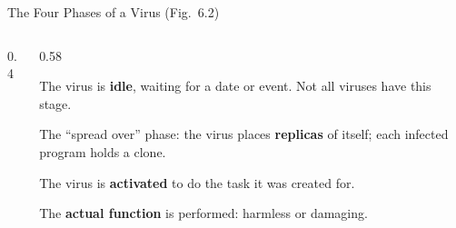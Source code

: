 \documentclass[aspectratio=169,11pt,xcolor={table}]{beamer}
\begin{document}
\begin{frame}{The Four Phases of a Virus (Fig.\ 6.2)}
  \begin{columns}[c]
    \begin{column}{0.4\textwidth}
      \centering
    \end{column}
    \begin{column}{0.58\textwidth}
      \begin{description}\small\setlength{\itemsep}{4pt}
        \item[\textcolor{ocean}{Dormant}] The virus is \textbf{idle}, waiting for a date or event. Not all viruses have this stage.
        \item[\textcolor{amber!80!black}{Propagation}] The ``spread over'' phase: the virus places \textbf{replicas} of itself; each infected program holds a clone.
        \item[\textcolor{grape}{Triggering}] The virus is \textbf{activated} to do the task it was created for.
        \item[\textcolor{brick}{Execution}] The \textbf{actual function} is performed: harmless or damaging.
      \end{description}
    \end{column}
  \end{columns}
\end{frame}
\end{document}
